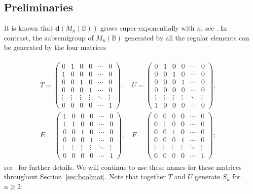 \documentclass[11pt]{article}
\numberwithin{equation}{section}
\newcommand{\B}{\mathbb{B}}
\newcommand{\Bn}{M_n(\B)}
\renewcommand{\d}{\mathbf{d}}
\begin{document}
\subsection{Preliminaries}
\label{sec:BMatPrelim}

It is known that $\d(\Bn)$ grows super-exponentially with $n$; see
. In contrast, the subsemigroup of $\Bn$ generated
by all the regular elements can be generated by the four matrices

\begin{align}
  \label{eq:RegularGens}
  \begin{split}
  T = \begin{pmatrix}
    0 & 1 & 0 & 0 & \cdots & 0 \\
    1 & 0 & 0 & 0 & \cdots & 0 \\
    0 & 0 & 1 & 0 & \cdots & 0 \\
    0 & 0 & 0 & 1 & \cdots & 0 \\
    \vdots  & \vdots & \vdots & \vdots & \ddots & \vdots\\
    0 & 0 & 0 & 0 & \cdots & 1 
  \end{pmatrix}\text{, }&
  U = \begin{pmatrix}
    0 & 1 & 0 & 0 & \cdots & 0 \\
    0 & 0 & 1 & 0 & \cdots & 0 \\
    0 & 0 & 0 & 1 & \cdots & 0 \\
    0 & 0 & 0 & 0 & \cdots & 0 \\
    \vdots  & \vdots & \vdots & \vdots & \ddots & \vdots\\
    1 & 0 & 0 & 0 & \cdots & 0 
  \end{pmatrix},\\
  E = \begin{pmatrix}
    1 & 0 & 0 & 0 & \cdots & 0 \\
    1 & 1 & 0 & 0 & \cdots & 0 \\
    0 & 0 & 1 & 0 & \cdots & 0 \\
    0 & 0 & 0 & 1 & \cdots & 0 \\
    \vdots  & \vdots & \vdots & \vdots & \ddots & \vdots\\
    0 & 0 & 0 & 0 & \cdots & 1 
  \end{pmatrix}\text{, }&
  F = \begin{pmatrix}
    0 & 0 & 0 & 0 & \cdots & 0 \\
    0 & 1 & 0 & 0 & \cdots & 0 \\
    0 & 0 & 1 & 0 & \cdots & 0 \\
    0 & 0 & 0 & 1 & \cdots & 0 \\
    \vdots  & \vdots & \vdots & \vdots & \ddots & \vdots\\
    0 & 0 & 0 & 0 & \cdots & 1
  \end{pmatrix};
\end{split}
\end{align}
see~\cite{Roush1977aa} for further details.
We will continue to use these names for these matrices throughout
Section~\ref{sec:boolmat}. Note that together $T$ and $U$ generate $S_n$ for $n
\geq 2$.
\end{document}
